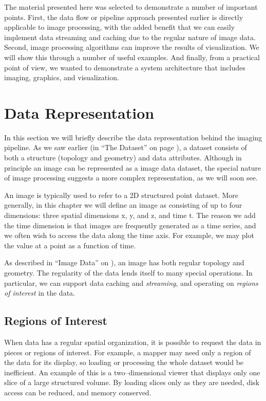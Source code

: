 The material presented here was selected to demonstrate a number of important points. First, the data flow or pipeline approach presented earlier is directly applicable to image processing, with the added benefit that we can easily implement data streaming and caching due to the regular nature of image data. Second, image processing algorithms can improve the results of visualization. We will show this through a number of useful examples. And finally, from a practical point of view, we wanted to demonstrate a system architecture that includes imaging, graphics, and visualization.

\section{Data Representation}

In this section we will briefly describe the data representation behind the imaging pipeline. As we saw earlier (in ``The Dataset'' on page \pageref{sec:dataset}), a dataset consists of both a structure (topology and geometry) and data attributes. Although in principle an image can be represented as a image data dataset, the special nature of image processing suggests a more complex representation, as we will soon see.

An image is typically used to refer to a 2D structured point dataset. More generally, in this chapter we will define an image as consisting of up to four dimensions: three spatial dimensions x, y, and z, and time t. The reason we add the time dimension is that images are frequently generated as a time series, and we often wish to access the data along the time axis. For example, we may plot the value at a point as a function of time.

As described in ``Image Data'' on \pageref{subsec:image_data}), an image has both regular topology and geometry. The regularity of the data lends itself to many special operations. In particular, we can support data caching and \emph{streaming}, and operating on \emph{regions of interest} in the data.

\subsection{Regions of Interest}

When data has a regular spatial organization, it is possible to request the data in pieces or regions of interest. For example, a mapper may need only a region of the data for its display, so loading or processing the whole dataset would be inefficient. An example of this is a two--dimensional viewer that displays only one slice of a large structured volume. By loading slices only as they are needed, disk access can be reduced, and memory conserved.

